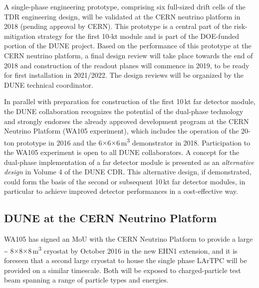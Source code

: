 A single-phase engineering prototype,
comprising six full-sized drift cells of the TDR engineering design,
will be validated at the CERN neutrino platform in 2018 (pending approval by CERN). 
This %
prototype is a central part of the risk-mitigation 
strategy for the first 10-kt module and is part of the DOE-funded portion of the DUNE project. 
Based on the  performance of this prototype at the CERN neutrino platform, a final design review will 
take place towards the end of 2018 and construction of the readout planes will 
commence in 2019, to be ready for first installation in 2021/2022. 
The design reviews 
will be organized by the DUNE technical coordinator.

In parallel with preparation for construction of the first 10\,kt far detector module, 
the DUNE collaboration recognizes the potential of the dual-phase technology and 
strongly endorses the already approved development program at the CERN Neutrino 
Platform (WA105 experiment), which includes the operation of the 20-ton prototype 
in 2016 and the 6$\times$6$\times$6\,m\textsuperscript{3} demonstrator in 2018. Participation 
to the WA105 experiment is open to all DUNE collaborators. A concept for the dual-phase 
implementation of a far detector module is presented as an \textit{alternative 
design} in Volume 4 of the DUNE CDR. This alternative design, if demonstrated, 
could form the basis of the second or subsequent 10\,kt far detector modules, in 
particular to achieve improved detector performances in a cost-effective way. 

\subsection{DUNE at the CERN Neutrino Platform}

WA105 has signed an MoU with the CERN Neutrino Platform to provide a large \textasciitilde{} 
8$\times$8$\times$8\,m\textsuperscript{3} cryostat by October 2016 in the new EHN1 extension, 
and it is foreseen that a second large cryostat to house the single phase LArTPC will 
be provided on a similar timescale. Both will be exposed to charged-particle test 
beam spanning a range of particle types and energies.   

